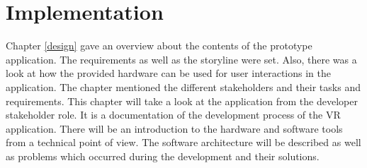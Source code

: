 \chapter{Implementation} \label{implementation}
Chapter \ref{design} gave an overview about the contents of the prototype application. The requirements as well as the storyline were set. Also, there was a look at how the provided hardware can be used for user interactions in the application. The chapter mentioned the different stakeholders and their tasks and requirements. This chapter will take a look at the application from the developer stakeholder role. It is a documentation of the development process of the VR application. There will be an introduction to the hardware and software tools from a technical point of view. The software architecture will be described as well as problems which occurred during the development and their solutions.

